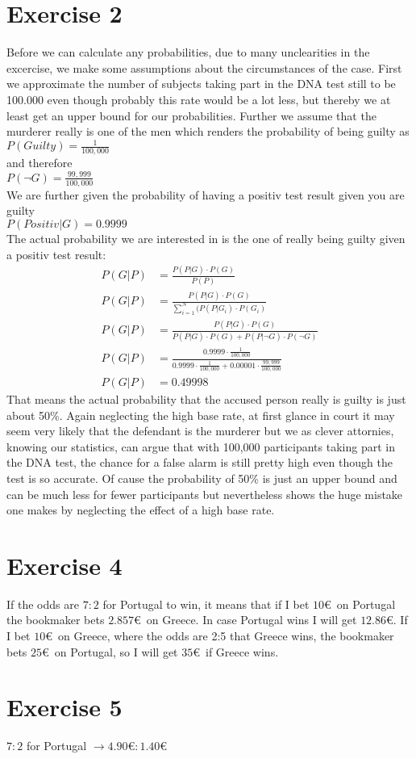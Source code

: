 \def \TutorialSheetNumber{3}


\section*{Exercise 2}
Before we can calculate any probabilities, due to many unclearities in the excercise, we make some assumptions about the circumstances of the case. First we approximate the number of subjects taking part in the DNA test still to be 100.000 even though probably this rate would be a lot less, but thereby we at least get an upper bound for our probabilities. Further we assume that the murderer really is one of the men which renders the probability of being guilty as \\ 
$P(Guilty) = \frac{1}{100,000}$\\
and therefore\\
$P(\neg G) = \frac{99,999}{100,000}$\\
We are further given the probability of having a positiv test result given you are guilty \\
$P(Positiv|G) = 0.9999 $ \\
The actual probability we are interested in is the one of really being guilty given a positiv test result:
\begin{align*}
  P(G | P) & = \frac{P(P|G) \cdot P(G)}{P(P)} \\
  P(G | P) & = \frac{P(P|G) \cdot P(G)}{\sum\limits_{i=1}^{N}(P(P|G_i)\cdot P(G_i)}\\
  P(G | P) & = \frac{P(P|G) \cdot P(G)}{P(P|G)\cdot P(G) + P(P|\neg G)\cdot P(\neg G)} \\
  P(G | P) & = \frac{0.9999 \cdot \frac{1}{100,000}}{0.9999 \cdot \frac{1}{100,000} + 0.00001 \cdot \frac{99,999}{100,000}}\\
  P(G | P) & = 0.49998
\end{align*}
 That means the actual probability that the accused person really is guilty is just about 50\%. Again neglecting the high base rate, at first glance in court  it may seem very likely that the defendant is the murderer but we as clever attornies, knowing our statistics, can argue that with 100,000 participants taking part in the DNA test, the chance for a false alarm is still pretty high even though the test is so accurate. Of cause the probability of 50\% is just an upper bound and can be much less for fewer participants but nevertheless shows the huge mistake one makes by neglecting the effect of a high base rate.  
\section*{Exercise 4}
If the odds are $7 : 2$ for Portugal to win, it means that if I bet $10$\euro\ on Portugal the bookmaker bets $2.857$\euro\ on Greece. In case Portugal wins I will get $12.86$\euro.
If I bet $10$\euro\ on Greece, where the odds are 2:5 that Greece wins, the bookmaker bets $25$\euro\ on Portugal, so I will get $35$\euro\ if Greece wins.

\section*{Exercise 5}
$7 : 2$ for Portugal $\rightarrow 4.90€ : 1.40€$




